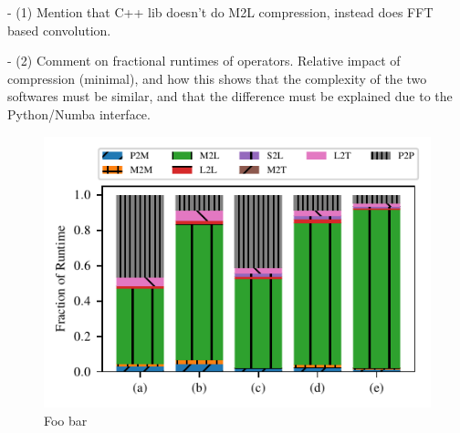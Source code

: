 \documentclass{IEEEcsmag}
\begin{document}
- (1) Mention that C++ lib doesn't do M2L compression, instead does FFT based convolution.

- (2) Comment on fractional runtimes of operators. Relative impact of compression (minimal), and how this shows that the complexity of the two softwares must be similar, and that the difference must be explained due to the Python/Numba interface.

\begin{figure}
	\centerline{\includegraphics {figures/operator_runtimes.pdf}}
	\caption{Foo bar}
	\label{fig:operator_runtimes}
\end{figure}
\end{document}
